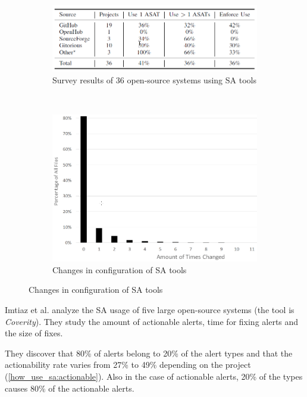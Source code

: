 \documentclass{article}
\begin{document}
 \begin{figure}[H]
     \begin{subfigure}{1\textwidth}
         \centering
         \includegraphics[scale=0.4]{./src/sa_analysis_survey_usage.png}
         \caption{Survey results of 36 open-source systems using SA tools}\label{sa_analysis_survey:usage}
     \end{subfigure}\\
     \begin{subfigure}{1\textwidth}
         \centering
         \includegraphics[scale=0.4]{./src/sa_analysis_survey_changes.png}
         \caption{Changes in configuration of SA tools}\label{sa_analysis_survey:changes}
     \end{subfigure}
 \end{figure}


 Imtiaz et al. \cite{how_act_sa} analyze the SA usage of five large open-source systems (the tool is \textit{Coverity}). They study the amount of actionable alerts, time for fixing alerts and the size of fixes.

 They discover that 80\% of alerts belong to 20\% of the alert types and that the actionability rate varies from 27\% to 49\% depending on the project (\cref{how_use_sa:actionable}). Also in the case of actionable alerts, 20\% of the types causes 80\% of the actionable alerts.
\end{document}
